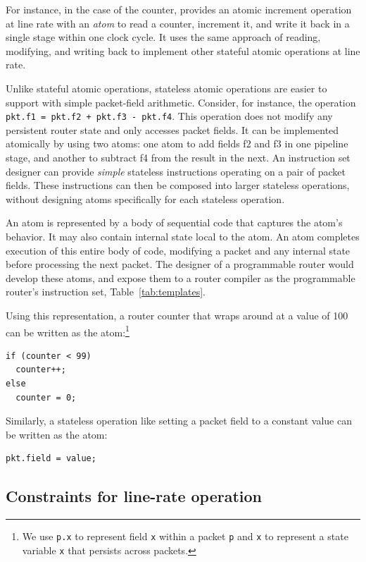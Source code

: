 For instance, in the case of the counter, \absmachine provides an atomic
increment operation at line rate with an {\em atom} to read a counter,
increment it, and write it back in a single stage within one clock cycle. It
uses the same approach of reading, modifying, and writing back to implement
other stateful atomic operations at line rate.

Unlike stateful atomic operations, stateless atomic operations are easier to
support with simple packet-field arithmetic.  Consider, for instance, the
operation {\tt pkt.f1 = pkt.f2 + pkt.f3 - pkt.f4}.  This operation does not
modify any persistent router state and only accesses packet fields. It can be
implemented atomically by using two atoms: one atom to add fields f2 and f3 in
one pipeline stage, and another to subtract f4 from the result in the next. An
instruction set designer can provide {\em simple} stateless instructions
operating on a pair of packet fields. These instructions can then be composed
into larger stateless operations, without designing atoms specifically for each
stateless operation.

An atom is represented by a body of sequential code that captures the atom's
behavior. It may also contain internal state local to the atom. An atom
completes execution of this entire body of code, modifying a packet and any
internal state before processing the next packet. The designer of a
programmable router would develop these atoms, and expose them to a router
compiler as the programmable router's instruction set, \eg
Table~\ref{tab:templates}.

Using this representation, a router counter that wraps around at a
value of 100 can be written as the atom:\footnote{We use {\tt p.x} to
  represent field {\tt x} within a packet {\tt p} and {\tt x} to
  represent a state variable {\tt x} that persists across packets.}
\begin{lstlisting}[style=customc, numbers=none, frame=none]
if (counter < 99)
  counter++;
else
  counter = 0;
\end{lstlisting}

Similarly, a stateless operation like setting a packet field to a constant
value can be written as the atom:
\begin{lstlisting}[style=customc, numbers=none, frame=none]
  pkt.field = value;
\end{lstlisting}

\subsection{Constraints for line-rate operation}
\label{s:atomConstraints}

